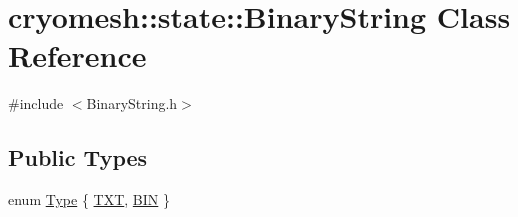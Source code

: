 \hypertarget{classcryomesh_1_1state_1_1BinaryString}{\section{cryomesh\-:\-:state\-:\-:\-Binary\-String \-Class \-Reference}
\label{classcryomesh_1_1state_1_1BinaryString}
}


{\ttfamily \#include $<$\-Binary\-String.\-h$>$}

\subsection*{\-Public \-Types}
\begin{DoxyCompactItemize}
\item 
enum \hyperlink{classcryomesh_1_1state_1_1BinaryString_adaad1428a9b504122a82b03879748466}{\-Type} \{ \hyperlink{classcryomesh_1_1state_1_1BinaryString_adaad1428a9b504122a82b03879748466ae29b88acd457612271587fc8a11b252a}{\-T\-X\-T}, 
\hyperlink{classcryomesh_1_1state_1_1BinaryString_adaad1428a9b504122a82b03879748466aa507e87a4889fddd05f3b03b0ba96ff7}{\-B\-I\-N}
 \}
\end{DoxyCompactItemize}
